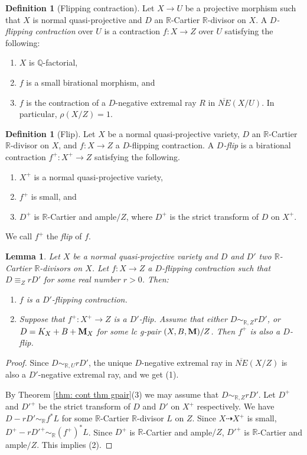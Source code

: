 \documentclass[11pt]{amsart}
\numberwithin{equation}{section}
\newcommand{\Mm}{{\bf{M}}}
\newcommand{\Qq}{\mathbb{Q}}
\newcommand{\Rr}{\mathbb{R}}
\newtheorem{lem}[thm]{Lemma}
\theoremstyle{definition}
\newtheorem{defn}[thm]{Definition}
\theoremstyle{definition}
\theoremstyle{definition}
\begin{document}
\begin{defn}[Flipping contraction]\label{defn: flipping contraction}
Let $X\rightarrow U$ be a projective morphism such that $X$ is normal quasi-projective and $D$ an $\Rr$-Cartier $\Rr$-divisor on $X$. A \emph{$D$-flipping contraction} over $U$ is a contraction $f: X\rightarrow Z$ over $U$ satisfying the following:
\begin{enumerate}
\item $X$ is $\Qq$-factorial,
 \item $f$ is a small birational morphism, and
    \item $f$ is the contraction of a $D$-negative extremal ray $R$ in $\overline{NE}(X/U)$. In particular, $\rho(X/Z)=1$.
\end{enumerate}
\end{defn}

\begin{defn}[Flip]\label{defn: flip}
Let $X$ be a normal quasi-projective variety, $D$ an $\Rr$-Cartier $\Rr$-divisor on $X$, and $f: X\rightarrow Z$ a $D$-flipping contraction. A \emph{$D$-flip} is a birational contraction $f^+: X^+\rightarrow Z$ satisfying the following.
\begin{enumerate}
\item $X^+$ is a normal quasi-projective variety,
    \item $f^+$ is small, and
    \item $D^+$ is $\Rr$-Cartier and ample$/Z$, where $D^+$ is the strict transform of $D$ on $X^+$.
\end{enumerate}
We call $f^{+}$ the \emph{flip} of $f$.
\end{defn}

\begin{lem}\label{lem: flip keep under rlinearequivalence}
Let $X$ be a normal quasi-projective variety and $D$ and $D'$ two $\Rr$-Cartier $\Rr$-divisors on $X$.  Let $f: X\rightarrow Z$ a $D$-flipping contraction such that $D\equiv_{Z}rD'$ for some real number $r>0$. Then:
\begin{enumerate}
    \item $f$ is a $D'$-flipping contraction. 
    \item Suppose that $f^+: X^+\rightarrow Z$ is a $D'$-flip. Assume that either $D\sim_{\mathbb R,Z}rD'$, or $D=K_X+B+\Mm_X$ for some lc g-pair $(X,B,\Mm)/Z$. Then $f^+$ is also a $D$-flip.
\end{enumerate}
\end{lem}
\begin{proof}
    Since $D\sim_{\mathbb R,U}rD'$, the unique $D$-negative extremal ray in $\overline{NE}(X/Z)$ is also a $D'$-negative extremal ray, and we get (1). 

By Theorem \ref{thm: cont thm gpair}(3) we may assume that  $D\sim_{\mathbb R,Z}rD'$. Let $D^+$ and $D'^+$ be the strict transform of $D$ and $D'$ on $X^+$ respectively. We have $D-rD'\sim_{\mathbb R}f^*L$ for some $\Rr$-Cartier $\Rr$-divisor $L$ on $Z$. Since $X\dashrightarrow X^+$ is small, $D^+-rD'^+\sim_{\mathbb R}(f^+)^*L$. Since $D^+$ is $\Rr$-Cartier and ample$/Z$, $D'^+$ is $\Rr$-Cartier and ample$/Z$. This implies (2).
\end{proof}
\end{document}
